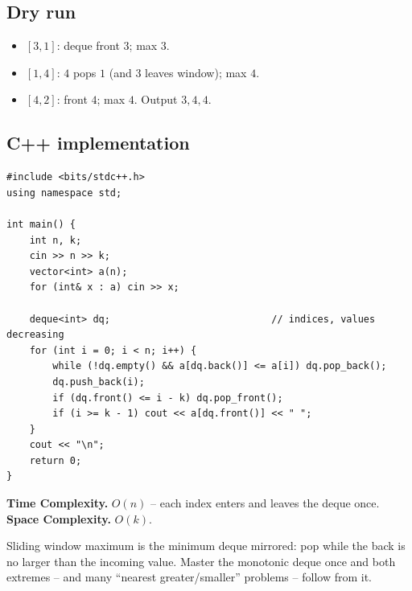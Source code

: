 \subsection*{Dry run}


\begin{itemize}
  \item $[3,1]$: deque front $3$; max $3$.
  \item $[1,4]$: $4$ pops $1$ (and $3$ leaves window); max $4$.
  \item $[4,2]$: front $4$; max $4$. Output $3,4,4$.
\end{itemize}

\subsection*{C++ implementation}

\begin{lstlisting}
#include <bits/stdc++.h>
using namespace std;

int main() {
    int n, k;
    cin >> n >> k;
    vector<int> a(n);
    for (int& x : a) cin >> x;

    deque<int> dq;                            // indices, values decreasing
    for (int i = 0; i < n; i++) {
        while (!dq.empty() && a[dq.back()] <= a[i]) dq.pop_back();
        dq.push_back(i);
        if (dq.front() <= i - k) dq.pop_front();
        if (i >= k - 1) cout << a[dq.front()] << " ";
    }
    cout << "\n";
    return 0;
}
\end{lstlisting}

\begin{complexitybox}
\textbf{Time Complexity.} $O(n)$ -- each index enters and leaves the deque
once. \textbf{Space Complexity.} $O(k)$.
\end{complexitybox}

\begin{takeawaybox}
Sliding window maximum is the minimum deque mirrored: pop while the back is
no larger than the incoming value. Master the monotonic deque once and both
extremes -- and many ``nearest greater/smaller'' problems -- follow from it.
\end{takeawaybox}
